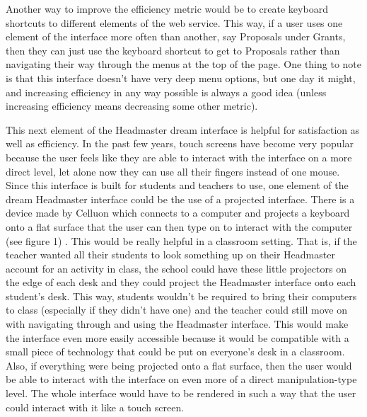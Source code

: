 \documentclass{article}
\begin{document}
Another way to improve the efficiency metric would be to create keyboard shortcuts to different elements of the web service. This way, if a user uses one element of the interface more often than another, say Proposals under Grants, then they can just use the keyboard shortcut to get to Proposals rather than navigating their way through the menus at the top of the page. One thing to note is that this interface doesn’t have very deep menu options, but one day it might, and increasing efficiency in any way possible is always a good idea (unless increasing efficiency means decreasing some other metric).

This next element of the Headmaster dream interface is helpful for satisfaction as well as efficiency. In the past few years, touch screens have become very popular because the user feels like they are able to interact with the interface on a more direct level, let alone now they can use all their fingers instead of one mouse. Since this interface is built for students and teachers to use, one element of the dream Headmaster interface could be the use of a projected interface. There is a device made by Celluon which connects to a computer and projects a keyboard onto a flat surface that the user can then type on to interact with the computer (see figure 1) \cite{celluon}. This would be really helpful in a classroom setting. That is, if the teacher wanted all their students to look something up on their Headmaster account for an activity in class, the school could have these little projectors on the edge of each desk and they could project the Headmaster interface onto each student's desk. This way, students wouldn’t be required to bring their computers to class (especially if they didn't have one) and the teacher could still move on with navigating through and using the Headmaster interface. This would make the interface even more easily accessible because it would be compatible with a small piece of technology that could be put on everyone's desk in a classroom. Also, if everything were being projected onto a flat surface, then the user would be able to interact with the interface on even more of a direct manipulation-type level. The whole interface would have to be rendered in such a way that the user could interact with it like a touch screen.
\end{document}
